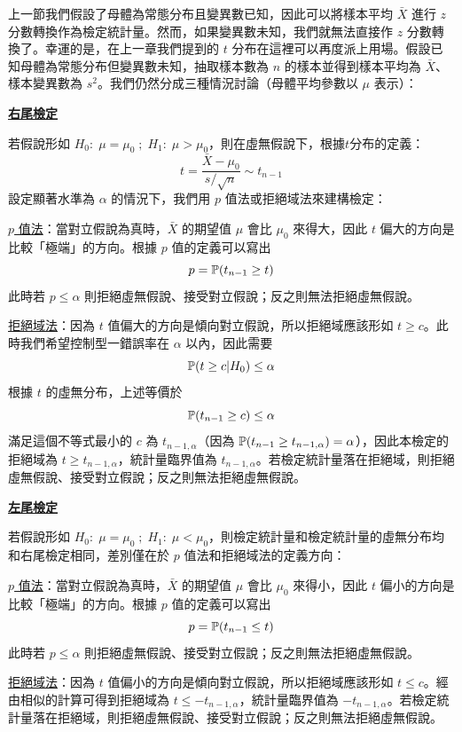     上一節我們假設了母體為常態分布且變異數已知，因此可以將樣本平均 $\bar{X}$ 進行 $z$ 分數轉換作為檢定統計量。然而，如果變異數未知，我們就無法直接作 $z$ 分數轉換了。幸運的是，在上一章我們提到的 $t$ 分布在這裡可以再度派上用場。假設已知母體為常態分布但變異數未知，抽取樣本數為 $n$ 的樣本並得到樣本平均為 $\bar{X}$、樣本變異數為 $s^2$。我們仍然分成三種情況討論（母體平均參數以 $\mu$ 表示）：

    \bigskip

    \noindent\underline{\textbf{右尾檢定}}

    若假說形如 $H_0: \; \mu = \mu_0 \; ; \; H_1: \; \mu > \mu_0$，則在虛無假說下，根據$t$分布的定義：
    \smallskip
    \[t = \frac{\bar{X}-\mu_0}{s/\sqrt{n}} \sim t_{n-1}\]
    \smallskip
    設定顯著水準為 $\alpha$ 的情況下，我們用 $p$ 值法或拒絕域法來建構檢定：

    \noindent \underline{$p$ 值法}：當對立假說為真時，$\bar{X}$ 的期望值 $\mu$ 會比 $\mu_0$ 來得大，因此 $t$ 偏大的方向是比較「極端」的方向。根據 $p$ 值的定義可以寫出
    \smallskip
    \[p = \mathbb{P}(t_{n-1} \ge t)\]
    \smallskip
    此時若 $p \le \alpha$ 則拒絕虛無假說、接受對立假說；反之則無法拒絕虛無假說。
    
    \noindent \underline{拒絕域法}：因為 $t$ 值偏大的方向是傾向對立假說，所以拒絕域應該形如 $t \ge c$。此時我們希望控制型一錯誤率在 $\alpha$ 以內，因此需要
    \smallskip
    \[\mathbb{P}(t \ge c|H_0) \le \alpha\]
    \smallskip
    根據 $t$ 的虛無分布，上述等價於
    \smallskip
    \[\mathbb{P}(t_{n-1} \ge c) \le \alpha\]
    \smallskip
    滿足這個不等式最小的 $c$ 為 $t_{n-1,\alpha}$（因為 $\mathbb{P}(t_{n-1} \ge t_{n-1,\alpha}) = \alpha$），因此本檢定的拒絕域為 $t \ge t_{n-1,\alpha}$，統計量臨界值為 $t_{n-1,\alpha}$。若檢定統計量落在拒絕域，則拒絕虛無假說、接受對立假說；反之則無法拒絕虛無假說。

    \bigskip

    \noindent\underline{\textbf{左尾檢定}}

    若假說形如 $H_0: \; \mu = \mu_0 \; ; \; H_1: \; \mu < \mu_0$，則檢定統計量和檢定統計量的虛無分布均和右尾檢定相同，差別僅在於 $p$ 值法和拒絕域法的定義方向：

    \noindent \underline{$p$ 值法}：當對立假說為真時，$\bar{X}$ 的期望值 $\mu$ 會比 $\mu_0$ 來得小，因此 $t$ 偏小的方向是比較「極端」的方向。根據 $p$ 值的定義可以寫出
    \smallskip
    \[p = \mathbb{P}(t_{n-1} \le t)\]
    \smallskip
    此時若 $p \le \alpha$ 則拒絕虛無假說、接受對立假說；反之則無法拒絕虛無假說。
    
    \noindent \underline{拒絕域法}：因為 $t$ 值偏小的方向是傾向對立假說，所以拒絕域應該形如 $t \le c$。經由相似的計算可得到拒絕域為 $t \le -t_{n-1,\alpha}$，統計量臨界值為 $-t_{n-1,\alpha}$。若檢定統計量落在拒絕域，則拒絕虛無假說、接受對立假說；反之則無法拒絕虛無假說。

